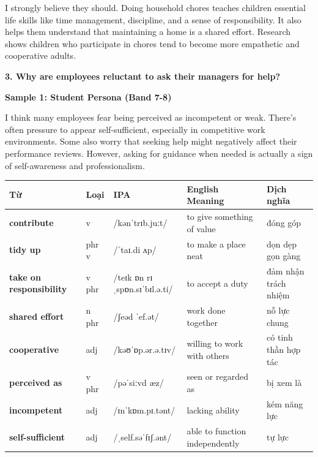I strongly believe they should. Doing household chores teaches children essential life skills like time management, discipline, and a sense of responsibility. It also helps them understand that maintaining a home is a shared effort. Research shows children who participate in chores tend to become more empathetic and cooperative adults.

\separator

\begin{ieltsquestion}
\textbf{3. Why are employees reluctant to ask their managers for help?}
\end{ieltsquestion}
\textbf{Sample 1: Student Persona (Band 7-8)}

I think many employees fear being perceived as incompetent or weak. There's often pressure to appear self-sufficient, especially in competitive work environments. Some also worry that seeking help might negatively affect their performance reviews. However, asking for guidance when needed is actually a sign of self-awareness and professionalism.

\separator


\vspace{0.8em}
\begin{center}
\renewcommand{\arraystretch}{1.65}
\begin{tabularx}{\textwidth}{|V{0.22\textwidth}|C{0.07\textwidth}|I{0.20\textwidth}|Y|V{0.18\textwidth}|}
\hline
{}
\textbf{Từ} & \textbf{Loại} & \textbf{IPA} & \textbf{English Meaning} & \textbf{Dịch nghĩa} \\
\hline
\textbf{contribute} & v & /kənˈtrɪb.juːt/ & to give something of value & đóng góp \\ \hline
\textbf{tidy up} & phr v & /ˈtaɪ.di ʌp/ & to make a place neat & dọn dẹp gọn gàng \\ \hline
\textbf{take on responsibility} & v phr & /teɪk ɒn rɪˌspɒn.sɪˈbɪl.ə.ti/ & to accept a duty & đảm nhận trách nhiệm \\ \hline
\textbf{shared effort} & n phr & /ʃeəd ˈef.ət/ & work done together & nỗ lực chung \\ \hline
\textbf{cooperative} & adj & /kəʊˈɒp.ər.ə.tɪv/ & willing to work with others & có tinh thần hợp tác \\ \hline
\textbf{perceived as} & v phr & /pəˈsiːvd æz/ & seen or regarded as & bị xem là \\ \hline
\textbf{incompetent} & adj & /ɪnˈkɒm.pɪ.tənt/ & lacking ability & kém năng lực \\ \hline
\textbf{self-sufficient} & adj & /ˌself.səˈfɪʃ.ənt/ & able to function independently & tự lực \\ \hline
\end{tabularx}
\end{center}

